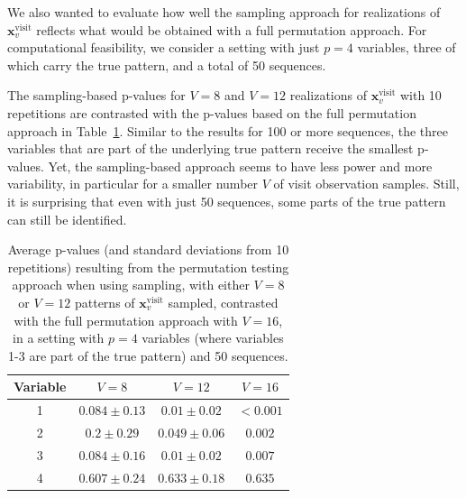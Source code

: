\documentclass[AMA,Times1COL]{WileyNJDv5} %
\begin{document}
We also wanted to evaluate how well the sampling approach for realizations of $\mathbf{x}_v^{\mathrm{visit}}$ reflects what would be obtained with a full permutation approach. For computational feasibility, we consider a setting with just $p=4$ variables, three of which carry the true pattern, and a total of 50 sequences. 

The sampling-based p-values for $V=8$ and $V=12$ realizations of $\mathbf{x}_v^{\mathrm{visit}}$ with 10 repetitions are contrasted with the p-values based on the full permutation approach in Table~\ref{tab:statistical_testing_results_sim}. Similar to the results for 100 or more sequences, the three variables that are part of the underlying true pattern receive the smallest p-values. Yet, the sampling-based approach seems to have less power and more variability, in particular for a smaller number $V$ of visit observation samples. Still, it is surprising that even with just 50 sequences, some parts of the true pattern can still be identified.


\begin{table}[tbp]

    \centering
    \footnotesize
    \caption{Average p-values (and standard deviations from 10 repetitions) resulting from the permutation testing approach when using sampling, with either $V=8$ or $V=12$ patterns of $\mathbf{x}_v^{\mathrm{visit}}$ sampled, contrasted with the full permutation approach with $V=16$, in a setting with $p=4$ variables (where variables 1-3 are part of the true pattern) and 50 sequences.}
    \label{tab:statistical_testing_results_sim}
     \begin{tabular}{cccc}
        \toprule
        Variable & 
        $V=8$ & 
        $V=12$ & 
        $V=16$\\  
        \midrule
         1  & \(0.084 \pm 0.13\)   & \(0.01 \pm 0.02\)   & \(<0.001\)  
            \\
         2  & \(0.2 \pm 0.29\)   & \(0.049 \pm 0.06\)   & \(0.002\)  
            \\
         3  & \(0.084 \pm 0.16\)   & \(0.01 \pm 0.02\)   & \(0.007\)  
            \\
         4  & \(0.607 \pm 0.24\)   & \(0.633 \pm 0.18\)   & \(0.635\)  
            \\
        \bottomrule
    \end{tabular}
\end{table}
\end{document}
